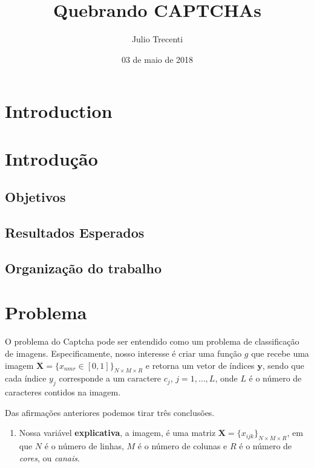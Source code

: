 \documentclass[12pt,]{report}
\title{Quebrando CAPTCHAs}
\author{Julio Trecenti}
\date{03 de maio de 2018}
\providecommand{\tightlist}{%
  \setlength{\itemsep}{0pt}\setlength{\parskip}{0pt}}
\begin{document}
\maketitle

{
\hypersetup{linkcolor=black}
\setcounter{tocdepth}{2}
\tableofcontents
}
\listoftables
\listoffigures
\chapter{Introduction}\label{introduction}

\chapter{Introdução}\label{introducao}

\section{Objetivos}\label{objetivos}

\section{Resultados Esperados}\label{resultados-esperados}

\section{Organização do trabalho}\label{organizacao-do-trabalho}

\chapter{Problema}\label{problema}

O problema do Captcha pode ser entendido como um problema de
classificação de imagens. Especificamente, nosso interesse é criar uma
função \(g\) que recebe uma imagem
\(\mathbf X = \{x_{nmr} \in [0,1]\}_{N\times M \times R}\) e retorna um
vetor de índices \(\mathbf y\), sendo que cada índice \(y_j\)
corresponde a um caractere \(c_j\), \(j = 1, \dots, L\), onde \(L\) é o
número de caracteres contidos na imagem.

Das afirmações anteriores podemos tirar três conclusões.

\begin{enumerate}
\def\labelenumi{\arabic{enumi}.}
\tightlist
\item
  Nossa variável \textbf{explicativa}, a imagem, é uma matriz
  \(\mathbf X = \{x_{ijk}\}_{N\times M \times R}\), em que \(N\) é o
  número de linhas, \(M\) é o número de colunas e \(R\) é o número de
  \emph{cores}, ou \emph{canais}.
\end{enumerate}
\end{document}
